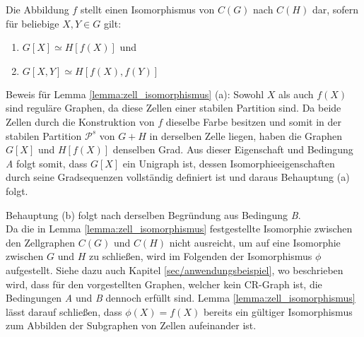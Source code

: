 \newpage

\begin{Lemma}
	Die Abbildung $f$ stellt einen Isomorphismus von $C(G)$ nach $C(H)$ dar, sofern für beliebige $X,Y\in G$ gilt:
	\begin{enumerate}[label=(\alph*)]
		\item $G[X]\simeq H[f(X)]$ und
		\item $G[X,Y]\simeq H[f(X),f(Y)]$
	\end{enumerate}
	\label{lemma:zell_isomorphismus}
\end{Lemma}

Beweis für Lemma \ref{lemma:zell_isomorphismus} (a):
Sowohl $X$ als auch $f(X)$ sind reguläre Graphen, da diese Zellen einer stabilen Partition sind.
Da beide Zellen durch die Konstruktion von $f$ dieselbe Farbe besitzen und somit in der stabilen Partition $\mathcal{P}^s$ von $G+H$ in derselben Zelle liegen, haben die Graphen $G[X]$ und $H[f(X)]$ denselben Grad.
Aus dieser Eigenschaft und Bedingung \emph{A} folgt somit, dass $G[X]$ ein Unigraph ist, dessen Isomorphieeigenschaften durch seine Gradsequenzen vollständig definiert ist und daraus Behauptung (a) folgt.

Behauptung (b) folgt nach derselben Begründung aus Bedingung \emph{B}.\\

Da die in Lemma \ref{lemma:zell_isomorphismus} festgestellte Isomorphie zwischen den Zellgraphen $C(G)$ und $C(H)$ nicht ausreicht, um auf eine Isomorphie zwischen $G$ und $H$ zu schließen, wird im Folgenden der Isomorphismus $\phi $ aufgestellt.
Siehe dazu auch Kapitel \ref{sec/anwendungsbeispiel}, wo beschrieben wird, dass für den vorgestellten Graphen, welcher kein CR-Graph ist, die Bedingungen \emph{A} und \emph{B} dennoch erfüllt sind.
Lemma \ref{lemma:zell_isomorphismus} lässt darauf schließen, dass $\phi (X)=f(X)$ bereits ein gültiger Isomorphismus zum Abbilden der Subgraphen von Zellen aufeinander ist.


